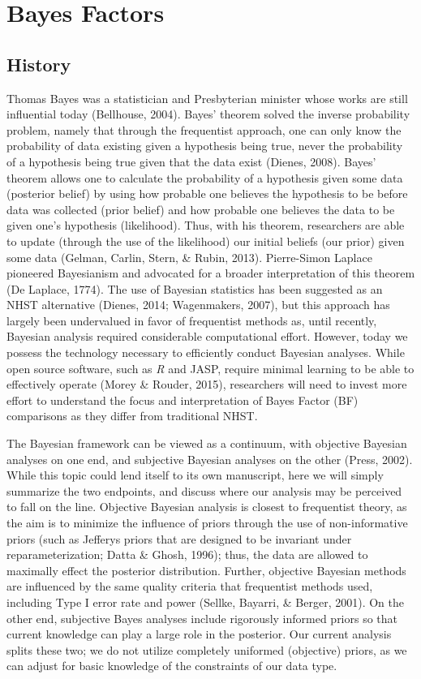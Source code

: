 \documentclass[,man, mask]{apa6}
\theoremstyle{definition}
\theoremstyle{definition}
\theoremstyle{definition}
\theoremstyle{remark}
\begin{document}
\section{Bayes Factors}\label{bayes-factors}

\subsection{History}\label{history-1}

Thomas Bayes was a statistician and Presbyterian minister whose works
are still influential today (Bellhouse, 2004). Bayes' theorem solved the
inverse probability problem, namely that through the frequentist
approach, one can only know the probability of data existing given a
hypothesis being true, never the probability of a hypothesis being true
given that the data exist (Dienes, 2008). Bayes' theorem allows one to
calculate the probability of a hypothesis given some data (posterior
belief) by using how probable one believes the hypothesis to be before
data was collected (prior belief) and how probable one believes the data
to be given one's hypothesis (likelihood). Thus, with his theorem,
researchers are able to update (through the use of the likelihood) our
initial beliefs (our prior) given some data (Gelman, Carlin, Stern, \&
Rubin, 2013). Pierre-Simon Laplace pioneered Bayesianism and advocated
for a broader interpretation of this theorem (De Laplace, 1774). The use
of Bayesian statistics has been suggested as an NHST alternative
(Dienes, 2014; Wagenmakers, 2007), but this approach has largely been
undervalued in favor of frequentist methods as, until recently, Bayesian
analysis required considerable computational effort. However, today we
possess the technology necessary to efficiently conduct Bayesian
analyses. While open source software, such as \emph{R} and JASP, require
minimal learning to be able to effectively operate (Morey \& Rouder,
2015), researchers will need to invest more effort to understand the
focus and interpretation of Bayes Factor (BF) comparisons as they differ
from traditional NHST.

The Bayesian framework can be viewed as a continuum, with objective
Bayesian analyses on one end, and subjective Bayesian analyses on the
other (Press, 2002). While this topic could lend itself to its own
manuscript, here we will simply summarize the two endpoints, and discuss
where our analysis may be perceived to fall on the line. Objective
Bayesian analysis is closest to frequentist theory, as the aim is to
minimize the influence of priors through the use of non-informative
priors (such as Jefferys priors that are designed to be invariant under
reparameterization; Datta \& Ghosh, 1996); thus, the data are allowed to
maximally effect the posterior distribution. Further, objective Bayesian
methods are influenced by the same quality criteria that frequentist
methods used, including Type I error rate and power (Sellke, Bayarri, \&
Berger, 2001). On the other end, subjective Bayes analyses include
rigorously informed priors so that current knowledge can play a large
role in the posterior. Our current analysis splits these two; we do not
utilize completely uniformed (objective) priors, as we can adjust for
basic knowledge of the constraints of our data type.
\end{document}
